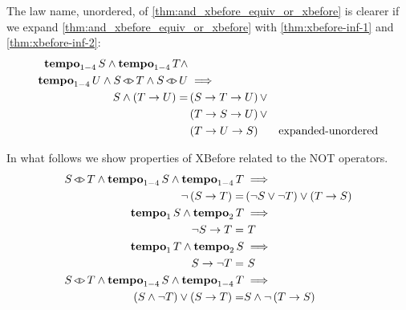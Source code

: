 The law name, unordered, of \cref{thm:and_xbefore_equiv_or_xbefore} is clearer if we expand \cref{thm:and_xbefore_equiv_or_xbefore} with \cref{thm:xbefore-inf-1} and  \cref{thm:xbefore-inf-2}:
%
\begin{align}
\tempo{S} \land \tempo{T} \land \nonumber\\
  \tempo{U} \land \independentevents{S}{T} \land \independentevents{S}{U} & \implies \nonumber\\
  S \land \parsin{\xbefore{T}{U}} = &
  \parsin{\xbefore{\xbefore{S}{T}}{U}} \lor \nonumber\\
  & \parsin{\xbefore{\xbefore{T}{S}}{U}} \lor \nonumber\\
  & \parsin{\xbefore{\xbefore{T}{U}}{S}} &
  \text{expanded-unordered}
  \label{thm:and_xbefore_equiv_or_xbefore_expanded}
%
%
%
\end{align}
%

In what follows we show properties of \ac{XBefore} related to the \ac{NOT} operators.
%
\begin{subequations}
\label{thms:xbefore-not}
\begin{align}
\independentevents{S}{T} \land
\tempo[1-4]{S} \land \tempo[1-4]{T} & \implies \nonumber\\
  \lnot \left(\xbefore{S}{T}\right) =&
  \left(\lnot S \lor \lnot T\right) \lor \left(\xbefore{T}{S}\right)
  \label{thm:not_xbefore}\\
\tempo[1]{S} \land \tempo[2]{T} & \implies \nonumber\\
  \xbefore{\lnot S}{T} = &~ T\label{thm:not_1_xbefore_equiv}\\
\tempo[1]{T} \land \tempo[2]{S} & \implies \nonumber\\
  \xbefore{S}{\lnot T} = &~ S\label{thm:not_2_xbefore_equiv}\\
\independentevents{S}{T} \land \tempo[1-4]{S} \land \tempo[1-4]{T} & \implies\nonumber\\
  \left(S \land \lnot T\right) \lor \left(\xbefore{S}{T}\right) = &
  S \land \lnot\left(\xbefore{T}{S} \right)
  \label{thm:xbefore_sup_compl_inf_absorb1}
\end{align}
\end{subequations}

